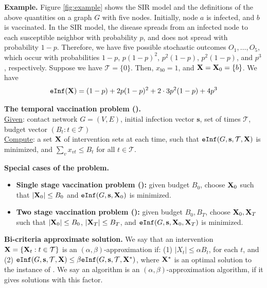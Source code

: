 \noindent
\textbf{Example.} Figure \ref{fig:example} shows the SIR model and the definitions of the above quantities
on a graph $G$ with five nodes. Initially, node $a$ is infected, and $b$ is vaccinated. 
In the SIR model, the disease spreads from an infected node to each susceptible neighbor with probability $p$,
and does not spread with probability $1-p$. Therefore, we have five possible stochastic outcomes $O_1,\ldots,O_5$,
which occur with probabilities $1-p$, $p(1-p)^2$, $p^2(1-p)$, $p^2(1-p)$, and $p^3$, respectively.
Suppose we have $\mathcal{T}=\{0\}$. Then, $x_{b0}=1$, and $\mathbf{X}=\mathbf{X}_0=\{b\}$.
We have 
\[
\texttt{eInf}(\mathbf{X})= (1-p) +2p(1-p)^2+2\cdot 3 p^2(1-p) + 4p^3
\]


\noindent
\textbf{The temporal vaccination problem (\prob).}\\
\underline{Given}: contact network $G=(V, E)$, initial infection vector $\mathbf{s}$, set of times $\mathcal{T}$,
budget vector $(B_t: t\in\mathcal{T})$\\
\underline{Compute}: a set $\mathbf{X}$ of intervention sets at each time, 
such that $\texttt{eInf}(G, \mathbf{s}, \mathcal{T}, \mathbf{X})$ is minimized, and $\sum_v x_{vt} \leq B_t$ for all $t\in\mathcal{T}$.

\noindent
\textbf{Special cases of the \prob{} problem.}
\begin{itemize}
\item
\textbf{Single stage vaccination problem (\probone):} given budget $B_0$, choose $\mathbf{X}_0$ such that $|\mathbf{X}_0|\leq B_0$
and $\texttt{eInf}(G, \mathbf{s}, \mathbf{X}_0)$ is minimized.
\item
\textbf{Two stage vaccination problem (\probtwo):} given budget $B_0, B_T$, choose $\mathbf{X}_0, \mathbf{X}_T$ such that
$|\mathbf{X}_0|\leq B_0$, $|\mathbf{X}_T|\leq B_T$, and $\texttt{eInf}(G, \mathbf{s}, \mathbf{X}_0, \mathbf{X}_T)$ is minimized.
\end{itemize}

\noindent
\textbf{Bi-criteria approximate solution.}
We say that an intervention $\mathbf{X}=\{\mathbf{X}_t: t\in\mathcal{T}\}$ is an $(\alpha, \beta)$-approximation if:
(1) $|X_t|\leq \alpha B_t$, for each $t$, and
(2) $\texttt{eInf}(G, \mathbf{s}, \mathcal{T}, \mathbf{X})\leq \beta \texttt{eInf}(G, \mathbf{s}, \mathcal{T}, \mathbf{X}^*)$, where
$\mathbf{X}^*$ is an optimal solution to the instance of \prob{}.
We say an algorithm is an $(\alpha, \beta)$-approximation algorithm, if it gives solutions with this factor.


